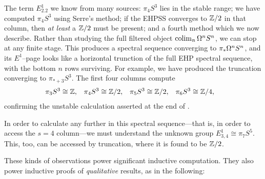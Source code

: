 The term $E^1_{2.2}$ we know from many sources: $\pi_4 S^3$ lies in the stable range; we have computed $\pi_4 S^3$ using Serre's method; if the EHPSS converges to $\mathbb Z/2$ in that column, then \emph{at least} a $\mathbb Z/2$ must be present; and a fourth method which we now describe.
Rather than studying the full filtered object $\operatorname{colim}_n \Omega^n S^n$, we can stop at any finite stage.
This produces a spectral sequence converging to $\pi_* \Omega^n S^n$, and its $E^1$--page looks like a horizontal trunction of the full EHP spectral sequence, with the bottom $n$ rows surviving.
\marginnote[-4\baselineskip]{
\phantom{weird bug}
\printpage[name = EHP, page = 0, y range={1}{3}]
}
For example, we have produced the truncation converging to $\pi_{*+3} S^3$.
The first four columns compute
\begin{align*}
\pi_3 S^3 & \cong \mathbb Z, &
\pi_4 S^3 & \cong \mathbb Z/2, &
\pi_5 S^3 & \cong \mathbb Z/2, &
\pi_6 S^3 & \cong \mathbb Z/4,
\end{align*}
confirming the unstable calculation asserted at the end of .

In order to calculate any further in this spectral sequence---that is, in order to access the $s = 4$ column---we must understand the unknown group $E^1_{3,4} \cong \pi_7 S^5$.
This, too, can be accessed by truncation,
\marginnote{
\phantom{weird bug}
\printpage[name = EHP, page = 0, y range={1}{5}]
}
where it is found to be $\mathbb Z/2$.

These kinds of observations power significant inductive computation.
They also power inductive proofs of \emph{qualitative} results, as in the following:

